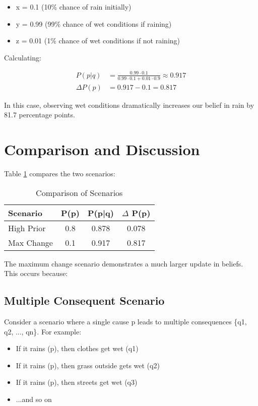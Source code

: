 \documentclass[10pt,letterpaper]{article}
\begin{document}
\begin{itemize}
    \item x = 0.1 (10\% chance of rain initially)
    \item y = 0.99 (99\% chance of wet conditions if raining)
    \item z = 0.01 (1\% chance of wet conditions if not raining)
\end{itemize}

Calculating:

\begin{align*}
    P(p|q) &= \frac{0.99 \cdot 0.1}{0.99 \cdot 0.1 + 0.01 \cdot 0.9} \approx 0.917 \\
    \Delta P(p) &= 0.917 - 0.1 = 0.817
\end{align*}

In this case, observing wet conditions dramatically increases our belief in rain by 81.7 percentage points.

\section{Comparison and Discussion}
Table \ref{tab:comparison} compares the two scenarios:

\begin{table}[h]
\centering
\caption{Comparison of Scenarios}
\label{tab:comparison}
\begin{tabular}{@{}lccc@{}}
\toprule
Scenario & P(p) & P(p|q) & $\Delta$ P(p) \\
\midrule
High Prior & 0.8 & 0.878 & 0.078 \\
Max Change & 0.1 & 0.917 & 0.817 \\
\bottomrule
\end{tabular}
\end{table}

The maximum change scenario demonstrates a much larger update in beliefs. This occurs because:

\subsection{Multiple Consequent Scenario}
Consider a scenario where a single cause p leads to multiple consequences \{q1, q2, ..., qn\}. For example:

\begin{itemize}
    \item If it rains (p), then clothes get wet (q1)
    \item If it rains (p), then grass outside gets wet (q2)
    \item If it rains (p), then streets get wet (q3)
    \item ...and so on
\end{itemize}
\end{document}
